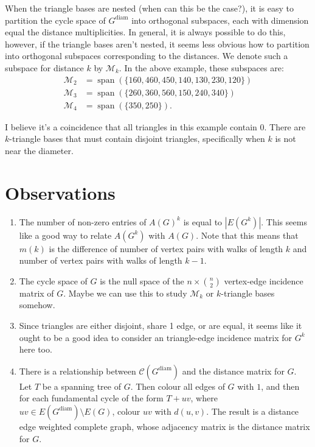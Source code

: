 \documentclass[12pt]{article}
\DeclareMathOperator{\subspan}{span}
\DeclareMathOperator{\diam}{diam}
\theoremstyle{definition}
\begin{document}
When the triangle bases are nested (when can this be the case?), it is easy to partition the cycle space of $G^{\diam}$ into orthogonal subspaces, each with dimension equal the distance multiplicities.  In general, it is always possible to do this, however, if the triangle bases aren't nested, it seems less obvious how to partition into orthogonal subspaces corresponding to the distances.  We denote such a subspace for distance $k$ by $\mathcal{M}_k$.  In the above example, these subspaces are:
\begin{align*}
	\mathcal{M}_2 &= \subspan(\{160, 460, 450, 140, 130, 230, 120\})	\\
	\mathcal{M}_3 &= \subspan(\{260, 360, 560, 150, 240, 340\})	\\
	\mathcal{M}_4 &= \subspan(\{350, 250\}).
\end{align*}

I believe it's a coincidence that all triangles in this example contain $0$.  There are $k$-triangle bases that must contain disjoint triangles, specifically when $k$ is not near the diameter.

\section{Observations}
\begin{enumerate}
	\item The number of non-zero entries of $A(G)^k$ is equal to $|E(G^k)|$.  This seems like a good way to relate $A(G^k)$ with $A(G)$.  Note that this means that $m(k)$ is the difference of number of vertex pairs with walks of length $k$ and number of vertex pairs with walks of length $k-1$.
	\item The cycle space of $G$ is the null space of the $n \times {n \choose 2}$ vertex-edge incidence matrix of $G$.  Maybe we can use this to study $\mathcal{M}_k$ or $k$-triangle bases somehow.
	\item Since triangles are either disjoint, share 1 edge, or are equal, it seems like it ought to be a good idea to consider an triangle-edge incidence matrix for $G^k$ here too.
	\item There is a relationship between $\mathcal{C}(G^{\diam})$ and the distance matrix for $G$.  Let $T$ be a spanning tree of $G$.  Then colour all edges of $G$ with $1$, and then for each fundamental cycle of the form $T+uv$, where $uv \in E(G^{\diam})\setminus E(G)$, colour $uv$ with $d(u,v)$.  The result is a distance edge weighted complete graph, whose adjacency matrix is the distance matrix for $G$.
\end{enumerate}
\end{document}
